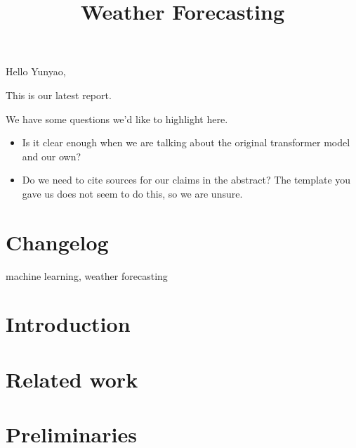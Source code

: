 


Hello Yunyao,

This is our latest report.

We have some questions we'd like to highlight here.

\begin{itemize}
    \item Is it clear enough when we are talking about the original transformer model and our own? 
    \item Do we need to cite sources for our claims in the abstract? The template you gave us does not seem to do this, so we are unsure.
\end{itemize}

\section{Changelog}




\newpage

\title{Weather Forecasting}
\author{
    \and
    \and
    \and
}


\maketitle

\begin{abstract}

\end{abstract}

\begin{IEEEkeywords}
machine learning, weather forecasting
\end{IEEEkeywords}

\section{Introduction}


\section{Related work}\label{sec:relatedwork}




\section{Preliminaries}



